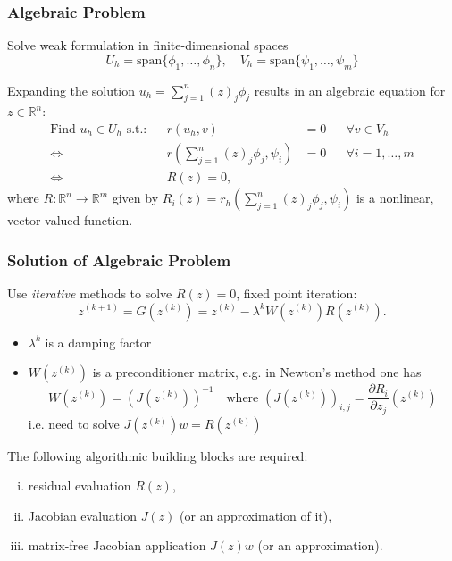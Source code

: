 \documentclass[aspectratio=169,11pt]{beamer}
\theoremstyle{definition}
\begin{document}
\begin{frame}
\frametitle{Algebraic Problem}
\rightarrownice Solve weak formulation in finite-dimensional spaces
\begin{equation*}
U_h=\text{span}\{\phi_1,\ldots,\phi_n\}, \quad V_h=\text{span}\{\psi_1,\ldots,\psi_m\}
\end{equation*}

Expanding the solution $u_h=\sum_{j=1}^n (z)_j\phi_j$
results in an algebraic equation for $z\in\mathbb{R}^n$:
\begin{align*}
\text{Find $u_h\in U_h$ s.t.:} && r(u_h,v)&=0 && \forall v\in V_h\\
\Leftrightarrow{} && r\left(\sum_{j=1}^n (z)_j\phi_j,\psi_i\right) &= 0 &&\forall i=1,\ldots,m\\
\Leftrightarrow{} && R(z) = 0,
\end{align*}
where $R: \mathbb{R}^n \to \mathbb{R}^m$ given by
$R_i(z) = r_h\left(\sum_{j=1}^n (z)_j\phi_j,\psi_i\right)$ is a nonlinear, vector-valued function.
\end{frame}

\begin{frame}
\frametitle{Solution of Algebraic Problem}
Use {\em iterative} methods to solve $R(z)=0$, fixed point iteration:
\begin{equation}
z^{(k+1)} = G(z^{(k)}) = z^{(k)} - \lambda^{k} W(z^{(k)}) R(z^{(k)}) .
\end{equation}
\vspace{-5mm}
\begin{itemize}
\item $\lambda^{k}$ is a damping factor
\item $W(z^{(k)})$ is a preconditioner matrix, e.g. in Newton's method one has
\begin{equation*}
W(z^{(k)}) = (J(z^{(k)}))^{-1} \quad \text{where $(J(z^{(k)}))_{i,j} = \frac{\partial R_i}{\partial z_j}
(z^{(k)})$}
\end{equation*}
i.e. need to solve $J\left(z^{(k)}\right) w = R(z^{(k)})$
\end{itemize}
The following algorithmic building blocks are required:
\begin{enumerate}[i)]
\item residual evaluation $R(z)$,
\item Jacobian evaluation $J(z)$ (or an approximation of it),
\item matrix-free Jacobian application $J(z) w$ (or an approximation).
\end{enumerate}
\end{frame}
\end{document}
